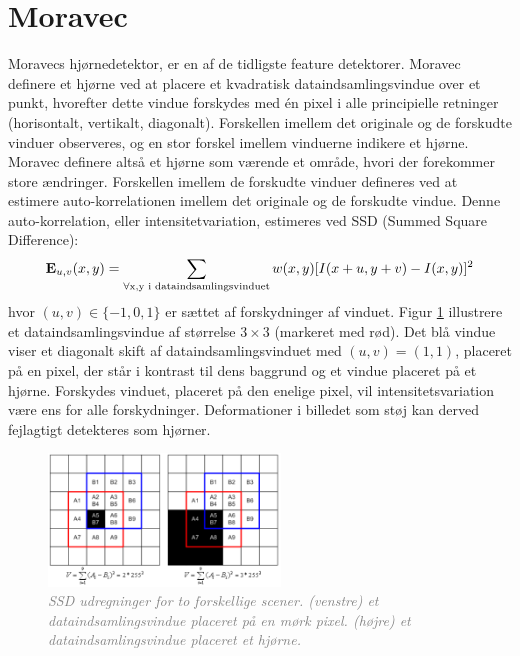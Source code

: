 \section{Moravec}\label{sec:moravec}
Moravecs hjørnedetektor\cite{moravec}, er en af de tidligste feature detektorer. Moravec definere et hjørne ved at placere et kvadratisk dataindsamlingsvindue over et punkt, hvorefter dette vindue forskydes med én pixel i alle principielle retninger (horisontalt, vertikalt, diagonalt). Forskellen imellem det originale og de forskudte vinduer observeres, og en stor forskel imellem vinduerne indikere et hjørne. Moravec definere altså et hjørne som værende et område, hvori der forekommer store ændringer. Forskellen imellem de forskudte vinduer defineres ved at estimere auto-korrelationen imellem det originale og de forskudte vindue. Denne auto-korrelation, eller intensitetvariation, estimeres ved SSD (Summed Square Difference):
\begin{equation}
\bold{E}_{u,v}(x,y)= \sum_{\forall \text{x,y i dataindsamlingsvinduet}} w(x,y)[I(x+u,y+v) - I(x,y)]^2
\label{moravec}     
\end{equation}
hvor $(u,v)\in \lbrace -1,0,1 \rbrace$ er sættet af forskydninger af vinduet.
Figur \ref{fig:moravec} illustrere et dataindsamlingsvindue af størrelse $3\times3$ (markeret med rød). Det blå vindue viser et diagonalt skift af dataindsamlingsvinduet med $(u,v)=(1,1)$, placeret på en pixel, der står i kontrast til dens baggrund og et vindue placeret på et hjørne. Forskydes vinduet, placeret på den enelige pixel, vil intensitetsvariation være ens for alle forskydninger. Deformationer i billedet som støj kan derved fejlagtigt detekteres som hjørner.
\begin{figure}[H]
    \centering
    \includegraphics[width=0.55\textwidth]{fig/25.png}
     \vspace{-1em}
    \begin{center}    
       \caption{\textcolor{gray}{\footnotesize \textit{SSD udregninger for to forskellige scener. (venstre) et dataindsamlingsvindue placeret på en mørk pixel. (højre) et dataindsamlingsvindue placeret et hjørne. }}}
    \label{fig:moravec}
     \end{center}
     \vspace{-2.5em}
  \end{figure} \noindent   
